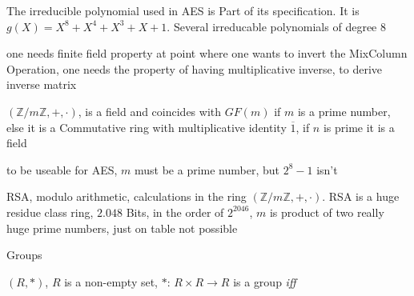 \documentclass[landscape, a4paper]{article}
\begin{document}
\begin{minipage}[t]{0.2\linewidth}
\begin{betterlist}
\begin{betterlist}
\begin{betterlist}
				\item The irreducible polynomial used in AES is Part of its specification. It is $g(X) = X^8 + X^4 + X^3 + X + 1$. Several irreducable polynomials of degree $8$
				\item one needs finite field property at point where one wants to invert the MixColumn Operation, one needs the property of having multiplicative inverse, to derive inverse matrix
			\end{betterlist}
			\item $(\mathbb{Z}/m\mathbb{Z}, +, \cdot)$, is a \alert{field} and coincides with $GF(m)$ if $m$ is a prime number, else it is a Commutative ring with multiplicative identity $\overline{1}$, if $n$ is prime it is a field
			\begin{betterlist}
				\item to be useable for AES, $m$ must be a prime number, but $2^8-1$ isn't
				\item RSA, modulo arithmetic, calculations in the ring $(\mathbb{Z}/m\mathbb{Z}, +, \cdot)$. RSA is a huge residue class ring, $2.048$ Bits, in the order of $2^{2046}$, $m$ is product of two really huge prime numbers, just on table not possible
			\end{betterlist}
		\end{betterlist}
		\begin{betterlist}
			\item \alert{Groups}
			\begin{betterlist}
				\item $(R, *)$, $R$ is a non-empty set, $*$: $R \times R \rightarrow R$ is a \alert{group} \textit{iff}

\end{betterlist}
\end{betterlist}
\end{betterlist}
\end{minipage}
\end{document}
